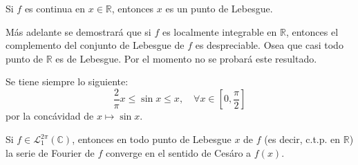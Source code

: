 \documentclass[12pt]{report}
\theoremstyle{largebreak}
\begin{document}
    \begin{exa}
        Si $f$ es continua en $x\in\mathbb{R}$, entonces $x$ es un punto de Lebesgue.
    \end{exa}

    Más adelante se demostrará que si $f$ es localmente integrable en $\mathbb{R}$, entonces el complemento del conjunto de Lebesgue de $f$ es despreciable. Osea que casi todo punto de $\mathbb{R}$ es de Lebesgue. Por el momento no se probará este resultado.

    \begin{obs}
        Se tiene siempre lo siguiente:
        \begin{equation*}
            \frac{2}{\pi}x \leq \sin x\leq x,\quad\forall x\in\left[0,\frac{\pi}{2}\right]
        \end{equation*}
        por la concávidad de $x\mapsto \sin x$.
    \end{obs}

    \begin{theor}
        Si $f\in\mathcal{L}_1^{2\pi}(\mathbb{C})$, entonces en todo punto de Lebesgue $x$ de $f$ (es decir, c.t.p. en $\mathbb{R}$) la serie de Fourier de $f$ converge en el sentido de Cesáro a $f(x)$.
    \end{theor}
\end{document}
